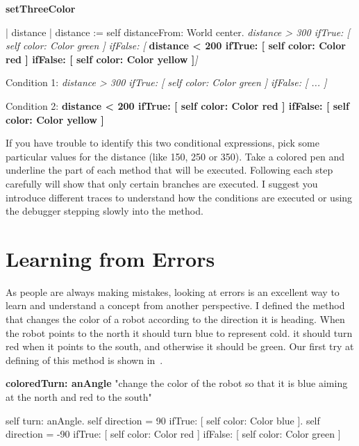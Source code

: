 \noindent
\begin{minipage}[l]{8cm}
\begin{method}\label{mth:detector4}
\textbf{setThreeColor}

   | distance | 
   distance := self distanceFrom: World  center.
   \textit{distance > 300
      ifTrue: [ self color: Color green ]
      ifFalse: [ }\textbf{distance < 200
         ifTrue: [ self color: Color red ]
         ifFalse: [ self color: Color yellow ]}\textit{]}
\end{method}
\end{minipage}
\hspace{1cm}
\begin{minipage}[r]{8cm}
\begin{nalltt}
\textrm{Condition 1:}
\textit{distance > 300
      ifTrue: [ self color: Color green ]
      ifFalse: [ ... ]}

\textrm{Condition 2:}
\textbf{distance < 200
         ifTrue: [ self color: Color red ]
         ifFalse: [ self color: Color yellow ]}
\end{nalltt}
\end{minipage}

If you have trouble to identify this two conditional expressions, pick some   particular values for the distance (like 150, 250 or 350). Take a colored pen and underline the part of each method that will be executed.  Following each step carefully will show  that only certain branches are executed. I suggest you introduce different traces to understand how the conditions are executed or using the debugger stepping slowly into the method. 

\section{Learning from Errors}
As people are always making mistakes, looking at errors is an excellent way to learn and understand a concept from another perspective.  I defined the method  that changes the color of a robot according to the direction it is heading.   When the robot points to the north it should turn blue to represent cold. it should turn red when it points to the south, and otherwise it should be green. Our first try at defining of this method is shown in~. 


\begin{method}\label{mth:colored}
\textbf{coloredTurn: anAngle}
     "change the color of the robot so that it is blue aiming 
     at the north and red to the south"

     self turn: anAngle.
     self direction = 90
         ifTrue: [ self color: Color blue ].
     self direction = -90
         ifTrue: [ self color: Color red ]
         ifFalse: [ self color: Color green ]
\end{method}

